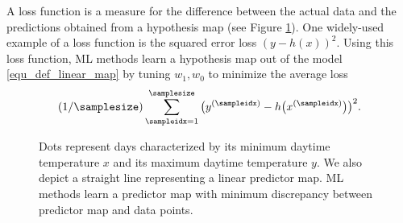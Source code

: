 \documentclass[12pt]{report}
\newcommand{\boundellipse}[3]%
{(#1) ellipse (#2 and #3)
}
\begin{document}
A loss function is a measure for the difference between the actual 
data and the predictions obtained from a hypothesis map (see Figure \ref{fig_scatterplot_temp_FMI_linalg}). 
One widely-used example of a loss function is the squared error loss $(y-h(x))^2$. 
Using this loss function, ML methods learn a hypothesis map 
out of the model \eqref{equ_def_linear_map} by tuning $w_{1},w_{0}$ to minimize 
the average loss $$(1/\samplesize) \sum_{\sampleidx=1}^{\samplesize} \big( y^{(\sampleidx)} - h\big(x^{(\sampleidx)} \big) \big)^{2}.$$

\begin{figure}[htbp]
	\begin{center}
		\vspace*{-14mm}
	\end{center}
	\caption{Dots represent days characterized by its minimum daytime temperature $x$ 
		and its maximum daytime temperature $y$. We also depict a straight line representing 
		a linear predictor map. ML methods learn a predictor map with minimum discrepancy 
		between predictor map and data points. 
	}
	\label{fig_scatterplot_temp_FMI_linalg}
	\vspace*{-3mm}
\end{figure}
\end{document}
